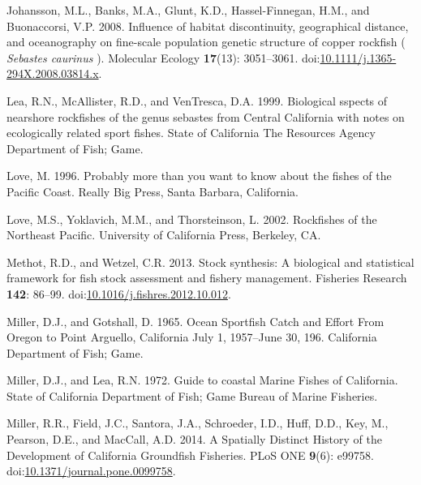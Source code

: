 \documentclass[11pt,
  english,
  letterpaper,
]{article}
\newlength{\cslhangindent}
\newenvironment{CSLReferences}[2] %
 {%
  \setlength{\parindent}{0pt}
  \ifodd #1 \everypar{\setlength{\hangindent}{\cslhangindent}}\ignorespaces\fi
  \ifnum #2 > 0
  \setlength{\parskip}{#2\baselineskip}
  \fi
 }%
 {}
\begin{document}
\begin{CSLReferences}{1}{0}
\leavevmode{}%
Johansson, M.L., Banks, M.A., Glunt, K.D., Hassel-Finnegan, H.M., and Buonaccorsi, V.P. 2008. Influence of habitat discontinuity, geographical distance, and oceanography on fine-scale population genetic structure of copper rockfish ( \emph{{Sebastes} caurinus} ). Molecular Ecology \textbf{17}(13): 3051--3061. doi:\href{https://doi.org/10.1111/j.1365-294X.2008.03814.x}{10.1111/j.1365-294X.2008.03814.x}.

\leavevmode{}%
Lea, R.N., McAllister, R.D., and VenTresca, D.A. 1999. Biological sspects of nearshore rockfishes of the genus sebastes from {Central} {California} with notes on ecologically related sport fishes. State of California The Resources Agency Department of Fish; Game.

\leavevmode{}%
Love, M. 1996. Probably more than you want to know about the fishes of the {Pacific} {Coast}. Really Big Press, Santa Barbara, California.

\leavevmode{}%
Love, M.S., Yoklavich, M.M., and Thorsteinson, L. 2002. Rockfishes of the {Northeast} {Pacific}. University of California Press, Berkeley, CA.

\leavevmode{}%
Methot, R.D., and Wetzel, C.R. 2013. Stock synthesis: A biological and statistical framework for fish stock assessment and fishery management. Fisheries Research \textbf{142}: 86--99. doi:\href{https://doi.org/10.1016/j.fishres.2012.10.012}{10.1016/j.fishres.2012.10.012}.

\leavevmode{}%
Miller, D.J., and Gotshall, D. 1965. Ocean {Sportfish} {Catch} and {Effort} {From} {Oregon} to {Point} {Arguello}, {California} {July} 1, 1957--{June} 30, 196. California Department of Fish; Game.

\leavevmode{}%
Miller, D.J., and Lea, R.N. 1972. Guide to coastal {Marine} {Fishes} of {California}. State of California Department of Fish; Game Bureau of Marine Fisheries.

\leavevmode{}%
Miller, R.R., Field, J.C., Santora, J.A., Schroeder, I.D., Huff, D.D., Key, M., Pearson, D.E., and MacCall, A.D. 2014. A {Spatially} {Distinct} {History} of the {Development} of {California} {Groundfish} {Fisheries}. PLoS ONE \textbf{9}(6): e99758. doi:\href{https://doi.org/10.1371/journal.pone.0099758}{10.1371/journal.pone.0099758}.


\end{CSLReferences}
\end{document}
